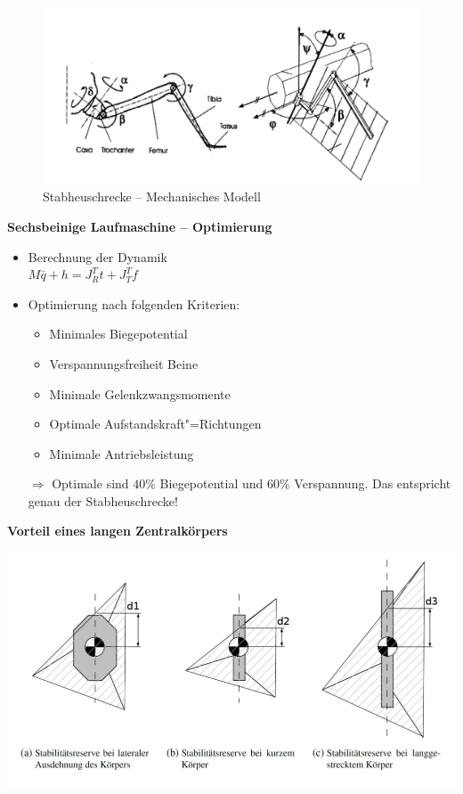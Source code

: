 \begin{figure}
	\centering
	\includegraphics[width=\textwidth]{figures/stabheuschrecke_mechanisch.png}
	\caption{Stabheuschrecke -- Mechanisches Modell}
	\label{ch:02:fig:stabheuschrecke_mechanisch}
\end{figure}

\textbf{Sechsbeinige Laufmaschine -- Optimierung}
\begin{itemize}
	\item Berechnung der Dynamik \\
	$M \stackrel{..}{q} + h = J^T_R t + J_T^T f$
	\item Optimierung nach folgenden Kriterien:
	\begin{itemize}
		\item Minimales Biegepotential
		\item Verspannungsfreiheit Beine
		\item Minimale Gelenkzwangsmomente
		\item Optimale Aufstandskraft"=Richtungen
		\item Minimale Antriebsleistung
	\end{itemize}
	\item[$\Rightarrow$] Optimale sind $40\%$ Biegepotential und $60\%$ Verspannung. Das entspricht genau der Stabheuschrecke!
\end{itemize}

\textbf{Vorteil eines langen Zentralkörpers}

\includegraphics[width=\textwidth]{figures/zentralkoerper.png}

